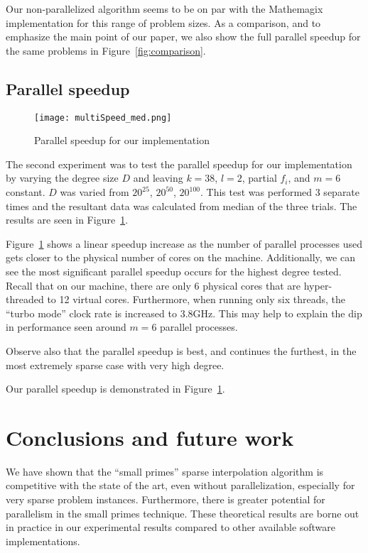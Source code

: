 \documentclass[letterpaper,10pt]{article}
\begin{document}
Our non-parallelized algorithm seems to be on par with the Mathemagix
implementation for this range of problem sizes. As a comparison, and to
emphasize the main point of our paper, we also show the full parallel
speedup for the same problems in Figure~\ref{fig:comparison}. 

\subsection{Parallel speedup}

\begin{figure}[tbp]
\texttt{[image: multiSpeed\_med.png]}
\caption{Parallel speedup for our implementation\label{fig:speedup}}
\end{figure}

The second experiment was to test the parallel speedup for our implementation by 
varying the degree size $D$ and leaving $k=38$, $l=2$, partial $f_i$, and $m=6$ constant. $D$
was varied from $20^{25}$, $20^{50}$, $20^{100}$. This test was performed 3 separate times 
and the resultant data was calculated from median of the three trials. 
The results are seen in Figure~\ref{fig:speedup}. 

Figure~\ref{fig:speedup} shows a linear speedup increase as the number of 
parallel processes used gets closer to the physical number of cores on the machine.
Additionally, we can see the most significant parallel speedup occurs for the highest
degree tested. Recall that on our machine, there are only 6 physical
cores that are hyper-threaded to 12 virtual cores. Furthermore, when
running only six threads, the ``turbo mode'' clock rate is increased to
3.8GHz. This may help to
explain the dip in performance seen around $m=6$ parallel processes.

Observe also that the parallel speedup is best, and continues the
furthest, in the most extremely sparse case with very high degree.

Our parallel speedup is demonstrated in Figure~\ref{fig:speedup}.

\section{Conclusions and future work}
\label{sec:conc}

We have shown that the ``small primes'' sparse interpolation algorithm
is competitive with the state of the art, even without parallelization,
especially for very sparse problem instances. Furthermore, there is
greater potential for parallelism in the small primes technique. These
theoretical results are borne out in practice in our experimental results
compared to other available software implementations.
\end{document}
